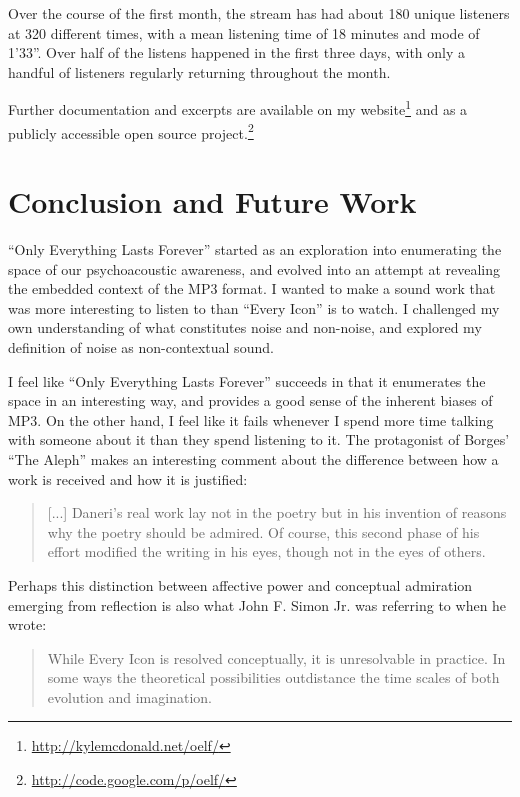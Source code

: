 \documentclass{thesis}
\begin{document}
Over the course of the first month, the stream has had about 180 unique listeners at 320 different times, with a mean listening time of 18 minutes and mode of 1'33''. Over half of the listens happened in the first three days, with only a handful of listeners regularly returning throughout the month.

Further documentation and excerpts are available on my website\footnote{\url{http://kylemcdonald.net/oelf/}} and as a publicly accessible open source project.\footnote{\url{http://code.google.com/p/oelf/}}

\chapter{Conclusion and Future Work}

``Only Everything Lasts Forever'' started as an exploration into enumerating the space of our psychoacoustic awareness, and evolved into an attempt at revealing the embedded context of the MP3 format. I wanted to make a sound work that was more interesting to listen to than ``Every Icon'' is to watch. I challenged my own understanding of what constitutes noise and non-noise, and explored my definition of noise as non-contextual sound.

I feel like ``Only Everything Lasts Forever'' succeeds in that it enumerates the space in an interesting way, and provides a good sense of the inherent biases of MP3. On the other hand, I feel like it fails whenever I spend more time talking with someone about it than they spend listening to it. The protagonist of Borges' ``The Aleph'' makes an interesting comment about the difference between how a work is received and how it is justified:
	
	\begin{quote}
	[...] Daneri's real work lay not in the poetry but in his invention of reasons why the poetry should be admired. Of course, this second phase of his effort modified the writing in his eyes, though not in the eyes of others.
	\end{quote}
	
Perhaps this distinction between affective power and conceptual admiration emerging from reflection is also what John F. Simon Jr. was referring to when he wrote:
	
	\begin{quote}
	While Every Icon is resolved conceptually, it is unresolvable in practice. In some ways the theoretical possibilities outdistance the time scales of both evolution and imagination.\cite{john_f._simon_jr._given:32_1997}
	\end{quote}
\end{document}
